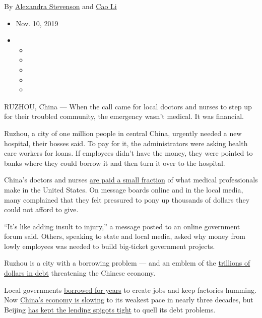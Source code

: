 By
\href{https://www.nytimes3xbfgragh.onion/by/alexandra-stevenson}{Alexandra
Stevenson} and \href{https://www.nytimes3xbfgragh.onion/by/cao-li}{Cao
Li}

\begin{itemize}
\item
  Nov. 10, 2019
\item
  \begin{itemize}
  \item
  \item
  \item
  \item
  \item
  \end{itemize}
\end{itemize}

RUZHOU, China --- When the call came for local doctors and nurses to
step up for their troubled community, the emergency wasn't medical. It
was financial.

Ruzhou, a city of one million people in central China, urgently needed a
new hospital, their bosses said. To pay for it, the administrators were
asking health care workers for loans. If employees didn't have the
money, they were pointed to banks where they could borrow it and then
turn it over to the hospital.

China's doctors and nurses
\href{https://www.nytimes3xbfgragh.onion/2018/09/30/business/china-health-care-doctors.html}{are
paid a small fraction} of what medical professionals make in the United
States. On message boards online and in the local media, many complained
that they felt pressured to pony up thousands of dollars they could not
afford to give.

``It's like adding insult to injury,'' a message posted to an online
government forum said. Others, speaking to state and local media, asked
why money from lowly employees was needed to build big-ticket government
projects.

Ruzhou is a city with a borrowing problem --- and an emblem of the
\href{https://www.nytimes3xbfgragh.onion/2017/05/24/business/china-downgrade-explained.html}{trillions
of dollars in debt} threatening the Chinese economy.

Local governments
\href{https://www.nytimes3xbfgragh.onion/2019/04/10/business/china-economy-debt-tianjin.html}{borrowed
for years} to create jobs and keep factories humming. Now
\href{https://www.nytimes3xbfgragh.onion/2019/10/17/business/china-economic-growth.html}{China's
economy is slowing} to its weakest pace in nearly three decades, but
Beijing
\href{https://www.nytimes3xbfgragh.onion/2018/06/14/business/economy/china-economy-debt-interest-rates.html}{has
kept the lending spigots tight} to quell its debt problems.

